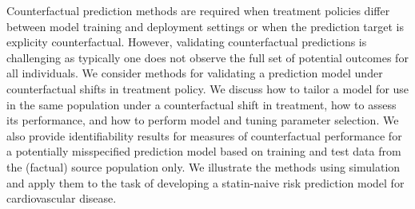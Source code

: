 Counterfactual prediction methods are required when treatment policies differ between model training and deployment settings or when the prediction target is explicity counterfactual. However, validating counterfactual predictions is challenging as typically one does not observe the full set of potential outcomes for all individuals. We consider methods for validating a prediction model under counterfactual shifts in treatment policy. We discuss how to tailor a model for use in the same population under a counterfactual shift in treatment, how to assess its performance, and how to perform model and tuning parameter selection. We also provide identifiability results for measures of counterfactual performance for a potentially misspecified prediction model based on training and test data from the (factual) source population only. We illustrate the methods using simulation and apply them to the task of developing a statin-naive risk prediction model for cardiovascular disease. \\
